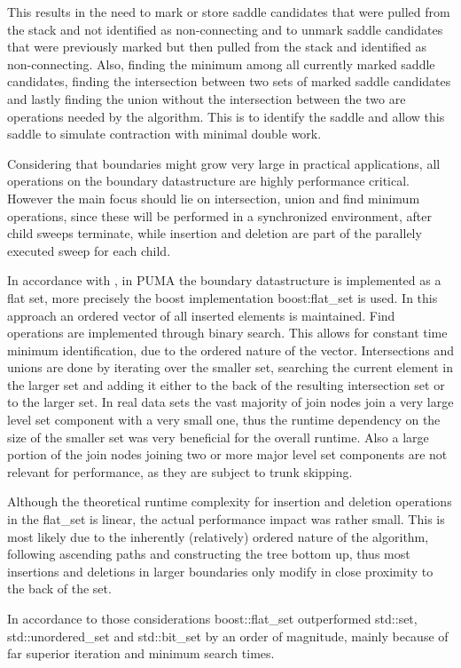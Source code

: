 \documentclass{scrartcl}
\begin{document}
This results in the need to mark or store saddle candidates that were pulled from the stack and not identified as non-connecting and to unmark saddle candidates that were previously marked but then pulled from the stack and identified as non-connecting. Also, finding the minimum among all currently marked saddle candidates, finding the intersection between two sets of marked saddle candidates and lastly finding the union without the intersection between the two are operations needed by the algorithm. This is to identify the saddle and allow this saddle to simulate contraction with minimal double work.

Considering that boundaries might grow very large in practical applications, all operations on the boundary datastructure are highly performance critical. However the main focus should lie on intersection, union and find minimum operations, since these will be performed in a synchronized environment, after child sweeps terminate, while insertion and deletion are part of the parallely executed sweep for each child. 

In accordance with \cite{flatset}, in PUMA the boundary datastructure is implemented as a flat set, more precisely the boost implementation boost:flat\_set is used. In this approach an ordered vector of all inserted elements is maintained. Find operations are implemented through binary search. This allows for constant time minimum identification, due to the ordered nature of the vector. Intersections and unions are done by iterating over the smaller set, searching the current element in the larger set and adding it either to the back of the resulting intersection set or to the larger set. In real data sets the vast majority of join nodes join a very large level set component with a very small one, thus the runtime dependency on the size of the smaller set was very beneficial for the overall runtime. Also a large portion of the join nodes joining two or more major level set components are not relevant for performance, as they are subject to trunk skipping.

Although the theoretical runtime complexity for insertion and deletion operations in the flat\_set is linear, the actual performance impact was rather small. This is most likely due to the inherently (relatively) ordered nature of the algorithm, following ascending paths and constructing the tree bottom up, thus most insertions and deletions in larger boundaries only modify in close proximity to the back of the set. 

In accordance to those considerations boost::flat\_set outperformed std::set, std::unordered\_set and std::bit\_set by an order of magnitude, mainly because of far superior iteration and minimum search times. 
\end{document}
